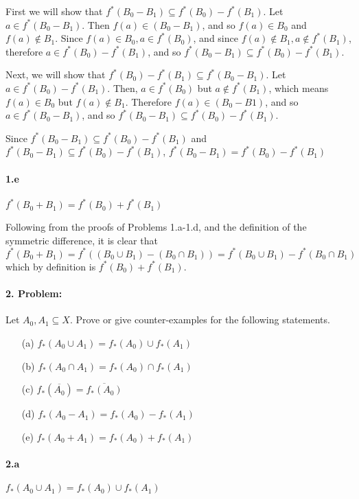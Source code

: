 \documentclass[12pt, letterpaper]{article}
\begin{document}
 First we will show that \(f^*(B_0 - B_1) \subseteq f^*(B_0) - f^*(B_1)\). Let \(a \in f^*(B_0-B_1)\). 
 Then \(f(a) \in (B_0 - B_1)\), and so \(f(a) \in B_0\) and \(f(a) \notin B_1\). Since \(f(a) \in B_0, a \in f^*(B_0)\), and since \(f(a) \notin B_1, a \notin f^*(B_1)\), therefore \(a \in  f^*(B_0) - f^*(B_1)\), and so \(f^*(B_0 - B_1) \subseteq f^*(B_0) - f^*(B_1)\).
 
 Next, we will show that \( f^*(B_0) - f^*(B_1) \subseteq f^*(B_0 - B_1)\). Let \(a \in  f^*(B_0) - f^*(B_1)\). Then, \(a \in f^*(B_0)\) but \(a \notin f^*(B_1)\), which means \(f(a) \in B_0\) but \(f(a) \notin B_1\). Therefore \(f(a) \in (B_0 - B1)\), and so \(a \in f^*(B_0 - B_1)\), and so \(f^*(B_0 - B_1) \subseteq f^*(B_0) - f^*(B_1)\).
 
 Since \(f^*(B_0 - B_1) \subseteq f^*(B_0) - f^*(B_1)\) and \(f^*(B_0 - B_1) \subseteq f^*(B_0) - f^*(B_1)\), \(f^*(B_0 - B_1) = f^*(B_0) - f^*(B_1)\)
 
 
 \paragraph{1.e} \(f^*(B_0 + B_1) = f^*(B_0) + f^*(B_1)\)
 
Following from the proofs of Problems 1.a-1.d, and the definition of the symmetric difference, it is clear that 
 \(
 	f^*(B_0 + B_1) =
 	f^*( (B_0 \cup B_1) - (B_0 \cap B_1)) = 
 	f^*(B_0 \cup B_1) - f^*(B_0 \cap B_1)\)
 which by definition is \(f^*(B_0) + f^*(B_1)\).
 
\paragraph{2. Problem:} Let \(A_0, A_1 \subseteq X\). Prove or give counter-examples for the following statements.

\begin{enumerate}
	\item[(a)] \(f_*(A_0 \cup A_1) = f_*(A_0) \cup f_*(A_1)\)
	\item[(b)] \(f_*(A_0 \cap A_1) = f_*(A_0) \cap f_*(A_1)\)
	\item[(c)] \(f_*(\overline{A_0}) = \overline{f_*(A_0)}\) 
	\item[(d)] \(f_*(A_0 - A_1) = f_*(A_0) - f_*(A_1)\)
	\item[(e)] \(f_*(A_0 + A_1) = f_*(A_0) + f_*(A_1)\)
\end{enumerate}
 \paragraph{2.a} \(f_*(A_0 \cup A_1) = f_*(A_0) \cup f_*(A_1)\)
\end{document}

